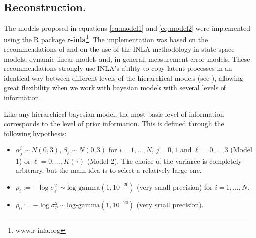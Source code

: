 \documentclass[11pt]{amsart}
\theoremstyle{plain}
\theoremstyle{definition}
\theoremstyle{remark}
\begin{document}
\subsection{Reconstruction.}
\label{sec:reconst}

The models proposed in equations \eqref{eq:model1} and \eqref{eq:model2} were
implemented using the R package \textbf{r-inla}\footnote{www.r-inla.org}. The
implementation was based on the recommendations of \cite{Ruiz-Cardenas2012} and
\cite{Muff2015} on the use of the INLA methodology in state-space models,
dynamic linear models and, in general, measurement error models. These
recommendations strongly use INLA's ability to copy latent processes in an
identical way between different levels of the hierarchical models (see \cite{Martins2013}), allowing
great flexibility when we work with bayesian models with several levels of
information.

Like any hierarchical bayesian model, the most basic level of information
corresponds to the level of prior information. This is defined through the
following hypothesis:
\begin{itemize}
\item $\alpha^i_j\sim N(0,3)$, $\beta_\ell \sim N(0,3)$ for $i=1,\ldots,N$, $j=0,1$ and $\ell=0,\ldots,3$
  (Model 1) or $\ell=0,\ldots,K(\tau)$ (Model 2). The choice of the variance is
  completely arbitrary, but the main idea is to select a relatively large one.
  
\item $\rho_i := -\log \sigma^2_{\epsilon^i}\sim \text{log-gamma}(1,10^{-20})$
  (very small precision) for $i=1,\ldots,N$.
  
\item $\rho_0 := -\log \sigma^2_\eta \sim \text{log-gamma}(1,10^{-20})$ (very
  small precision).
\end{itemize}
\end{document}
